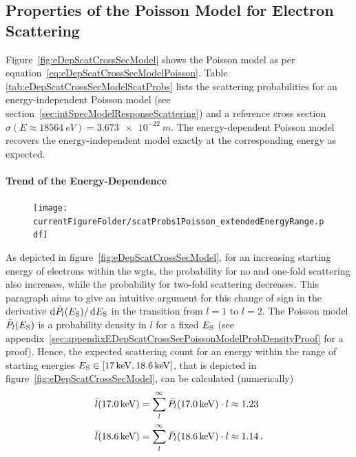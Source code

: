 \subsection{Properties of the Poisson Model for Electron Scattering}
\label{sec:eDepScatCrossSecModelPoissonProperties}
Figure~\ref{fig:eDepScatCrossSecModel} shows the Poisson model as per equation~\eqref{eq:eDepScatCrossSecModelPoisson}. Table \ref{tab:eDepScatCrossSecModelScatProbs} lists the scattering probabilities for an energy-independent Poisson model (see section~\ref{sec:intSpecModelResponseScattering}) and a reference cross section $\sigma(E\approx\SI{18564}{eV})=\SI{3.673e-22}{m}$. The energy-dependent Poisson model recovers the energy-independent model exactly at the corresponding energy as expected.

\paragraph{Trend of the Energy-Dependence}
\begin{figure}[th]
	\texttt{[image: \\currentFigureFolder/scatProbs1Poisson\_extendedEnergyRange.pdf]}
	\label{fig:eDepScatCrossSecModelPoissonP1ExtendedEnergyRange}
\end{figure}
As depicted in figure~\ref{fig:eDepScatCrossSecModel}, for an increasing starting energy of electrons within the \gls{wgts}, the probability for no and one-fold scattering also increases, while the probability for two-fold scattering decreases. This paragraph aims to give an intuitive argument for this change of sign in the derivative $\mathop{}\!\mathrm{d} \bar{P}_l(E_\mathrm{S}) / \mathop{}\!\mathrm{d} E_\mathrm{S}$ in the transition from $l=1$ to $l=2$. The Poisson model $\bar{P}_l(E_\mathrm{S})$ is a probability density in $l$ for a fixed $E_\mathrm{S}$ (see appendix~\ref{sec:appendixEDepScatCrossSecPoissonModelProbDensityProof} for a proof). Hence, the expected scattering count for an energy within the range of starting energies $E_\mathrm{S} \in [\SI{17}{keV}, \SI{18.6}{keV}]$, that is depicted in figure~\ref{fig:eDepScatCrossSecModel}, can be calculated (numerically)
\begin{equation}
\label{eq:eDepScatCrossSecModelPoissonExpectedScatCount}
\begin{split}	
	\bar{l}(\SI{17.0}{keV}) &= 
	\sum_{l}^{\infty} \bar{P}_l(\SI{17.0}{keV}) \cdot l \approx 1.23 \\	
	\bar{l}(\SI{18.6}{keV}) &= 
	\sum_{l}^{\infty} \bar{P}_l(\SI{18.6}{keV}) \cdot l \approx 1.14
	\text{\,.}
\end{split}
\end{equation} 
